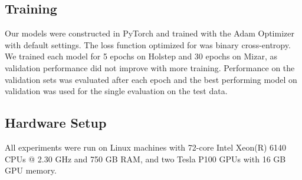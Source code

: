 \documentclass{article}
\begin{document}
\subsection{Training}

Our models were constructed in PyTorch \cite{paszke2017automatic} and trained with the Adam Optimizer \cite{kingma2014adam} with default settings. The loss function optimized for was binary cross-entropy. We trained each model for 5 epochs on Holstep and 30 epochs on Mizar, as validation performance did not improve with more training. 
Performance on the validation sets was evaluated after each epoch and the best performing model on validation was used for the single evaluation on the test data.

\subsection{Hardware Setup}

All experiments were run on Linux machines with 72-core Intel Xeon(R) 6140 CPUs @ 2.30 GHz and 750 GB RAM, and two Tesla P100 GPUs with 16 GB GPU memory.

 
\end{document}

